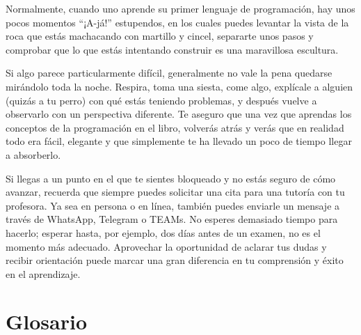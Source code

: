 Normalmente, cuando uno aprende su primer lenguaje de programación, hay
unos pocos momentos ``¡A-já!'' estupendos, en los cuales puedes levantar
la vista de la roca que estás machacando con martillo y cincel,
separarte unos pasos y comprobar que lo que estás intentando construir
es una maravillosa escultura.

Si algo parece particularmente difícil, generalmente no vale la pena
quedarse mirándolo toda la noche. Respira, toma una siesta, come algo,
explícale a alguien (quizás a tu perro) con qué estás teniendo
problemas, y después vuelve a observarlo con un perspectiva diferente.
Te aseguro que una vez que aprendas los conceptos de la programación en
el libro, volverás atrás y verás que en realidad todo era fácil,
elegante y que simplemente te ha llevado un poco de tiempo llegar a
absorberlo.


Si llegas a un punto en el que te sientes bloqueado y no estás seguro de cómo avanzar, recuerda que siempre puedes solicitar una cita para una tutoría con tu profesora. Ya sea en persona o en línea, también puedes enviarle un mensaje a través de WhatsApp, Telegram o TEAMs. No esperes demasiado tiempo para hacerlo; esperar hasta, por ejemplo, dos días antes de un examen, no es el momento más adecuado. Aprovechar la oportunidad de aclarar tus dudas y recibir orientación puede marcar una gran diferencia en tu comprensión y éxito en el aprendizaje.

\hypertarget{glosario_introduccion}{%
\section{Glosario}\label{glosario_introduccion}}


